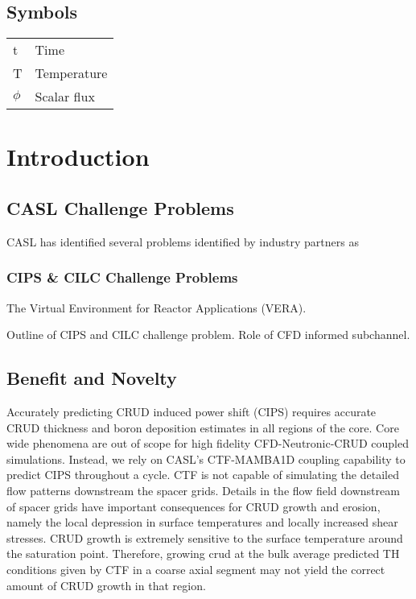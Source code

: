 \documentclass[10pt,a4paper]{report}
\begin{document}
\section*{Symbols}
\begin{tabular}{l l}
t & Time \\
T & Temperature \\
$\phi$ & Scalar flux \\
\end{tabular}

\pagebreak
\onehalfspacing

\chapter{Introduction}

\section{CASL Challenge Problems}

CASL has identified several problems identified by industry partners as 

\subsection{CIPS \& CILC Challenge Problems}

The Virtual Environment for Reactor Applications (VERA).

Outline of CIPS and CILC challenge problem.  Role of CFD informed subchannel.

\section{Benefit and Novelty}

Accurately predicting CRUD induced power shift (CIPS) requires accurate CRUD thickness and boron deposition estimates in all regions of the core.  Core wide phenomena are out of scope for high fidelity CFD-Neutronic-CRUD coupled simulations.  Instead, we rely on CASL's CTF-MAMBA1D coupling capability to predict CIPS throughout a cycle.  CTF is not capable of simulating the detailed flow patterns downstream the spacer grids.  Details in the flow field downstream of spacer grids have important consequences for CRUD growth and erosion, namely the local depression in surface temperatures and locally increased shear stresses.  CRUD growth is extremely sensitive to the surface temperature around the saturation point.  Therefore, growing crud at the bulk average predicted TH conditions given by CTF in a coarse axial segment may not yield the correct amount of CRUD growth in that region.
\end{document}
